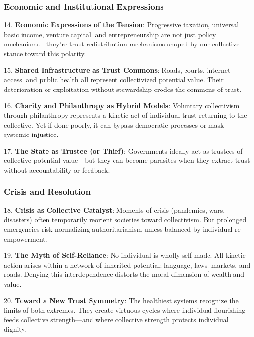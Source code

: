 \documentclass[11pt,oneside]{book}
\begin{document}
\subsubsection{Economic and Institutional Expressions}


14. \textbf{Economic Expressions of the Tension}: Progressive taxation, universal basic income, venture capital, and entrepreneurship are not just policy mechanisms—they're trust redistribution mechanisms shaped by our collective stance toward this polarity.



15. \textbf{Shared Infrastructure as Trust Commons}: Roads, courts, internet access, and public health all represent collectivized potential value. Their deterioration or exploitation without stewardship erodes the commons of trust.



16. \textbf{Charity and Philanthropy as Hybrid Models}: Voluntary collectivism through philanthropy represents a kinetic act of individual trust returning to the collective. Yet if done poorly, it can bypass democratic processes or mask systemic injustice.



17. \textbf{The State as Trustee (or Thief)}: Governments ideally act as trustees of collective potential value—but they can become parasites when they extract trust without accountability or feedback.


\subsubsection{Crisis and Resolution}


18. \textbf{Crisis as Collective Catalyst}: Moments of crisis (pandemics, wars, disasters) often temporarily reorient societies toward collectivism. But prolonged emergencies risk normalizing authoritarianism unless balanced by individual re-empowerment.



19. \textbf{The Myth of Self-Reliance}: No individual is wholly self-made. All kinetic action arises within a network of inherited potential: language, laws, markets, and roads. Denying this interdependence distorts the moral dimension of wealth and value.



20. \textbf{Toward a New Trust Symmetry}: The healthiest systems recognize the limits of both extremes. They create virtuous cycles where individual flourishing feeds collective strength—and where collective strength protects individual dignity.
\end{document}
